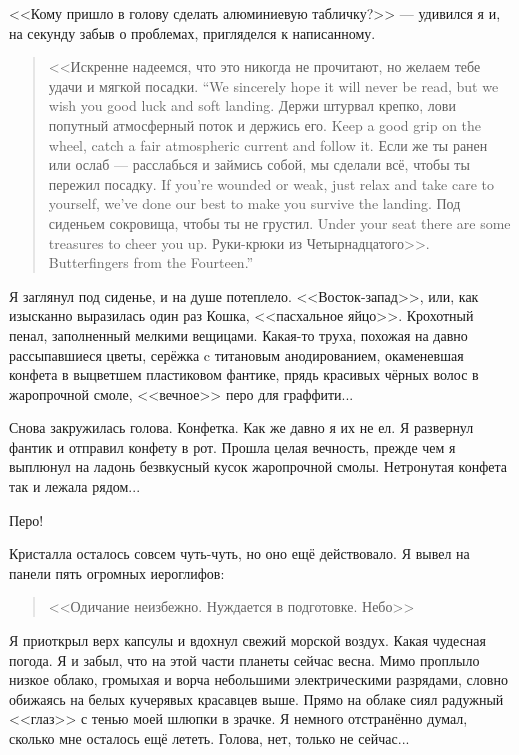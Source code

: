 <<Кому пришло в голову сделать алюминиевую табличку?>> --- удивился я и, на секунду забыв о проблемах, пригляделся к написанному.

\begin{quote}
{<<Искренне надеемся, что это никогда не прочитают, но желаем тебе удачи и мягкой посадки.}
{``We sincerely hope it will never be read, but we wish you good luck and soft landing.}
{Держи штурвал крепко, лови попутный атмосферный поток и держись его.}
{Keep a good grip on the wheel, catch a fair atmospheric current and follow it.}
{Если же ты ранен или ослаб --- расслабься и займись собой, мы сделали всё, чтобы ты пережил посадку.}
{If you're wounded or weak, just relax and take care to yourself, we've done our best to make you survive the landing.}
{Под сиденьем сокровища, чтобы ты не грустил.}
{Under your seat there are some treasures to cheer you up.}
{Руки-крюки из Четырнадцатого>>.}
{Butterfingers from the Fourteen.''}
\end{quote}

Я заглянул под сиденье, и на душе потеплело.
<<Восток-запад>>, или, как изысканно выразилась один раз Кошка, <<пасхальное яйцо>>.
Крохотный пенал, заполненный мелкими вещицами.
Какая-то труха, похожая на давно рассыпавшиеся цветы, серёжка c титановым анодированием, окаменевшая конфета в выцветшем пластиковом фантике, прядь красивых чёрных волос в жаропрочной смоле, <<вечное>> перо для граффити...

Снова закружилась голова.
Конфетка.
Как же давно я их не ел.
Я развернул фантик и отправил конфету в рот.
Прошла целая вечность, прежде чем я выплюнул на ладонь безвкусный кусок жаропрочной смолы.
Нетронутая конфета так и лежала рядом...

Перо!

Кристалла осталось совсем чуть-чуть, но оно ещё действовало.
Я вывел на панели пять огромных иероглифов:

\begin{quote}
<<Одичание неизбежно.
Нуждается в подготовке.
Небо>>
\end{quote}

Я приоткрыл верх капсулы и вдохнул свежий морской воздух.
Какая чудесная погода.
Я и забыл, что на этой части планеты сейчас весна.
Мимо проплыло низкое облако, громыхая и ворча небольшими электрическими разрядами, словно обижаясь на белых кучерявых красавцев выше.
Прямо на облаке сиял радужный <<глаз>> с тенью моей шлюпки в зрачке.
Я немного отстранённо думал, сколько мне осталось ещё лететь.
Голова, нет, только не сейчас...

